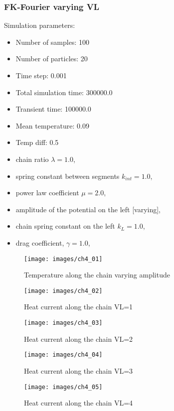 \subsubsection{FK-Fourier varying VL}
Simulation parameters:
\begin{itemize}
	\item Number of samples: 100
	\item Number of particles: 20
	\item Time step: 0.001
	\item Total simulation time: 300000.0
	\item Transient time: 100000.0
	\item Mean temperature: 0.09
	\item Temp diff: 0.5
	\item chain ratio $ \lambda=1.0 $,
	\item spring constant between segments $ k_{int} = 1.0 $,
	\item power law coefficient $ \mu=2.0 $,
	\item amplitude of the potential on the left [varying],
	\item chain spring constant on the left $ k_{L}=1.0 $,
	\item drag coefficient, $ \gamma=1.0 $,
\end{itemize}

\begin{figure}[H]
	\centering
	\texttt{[image: images/ch4\_01]}
	\caption{Temperature along the chain varying amplitude}
	\label{fig:ch4_01}
\end{figure}

\begin{figure}[H]
	\centering
	\texttt{[image: images/ch4\_02]}
	\caption{Heat current along the chain VL=1}
	\label{fig:ch4_02}
\end{figure}


\begin{figure}[H]
	\centering
	\texttt{[image: images/ch4\_03]}
	\caption{Heat current along the chain VL=2}
	\label{fig:ch4_03}
\end{figure}

\begin{figure}[H]
	\centering
	\texttt{[image: images/ch4\_04]}
	\caption{Heat current along the chain VL=3}
	\label{fig:ch4_04}
\end{figure}

\begin{figure}[H]
	\centering
	\texttt{[image: images/ch4\_05]}
	\caption{Heat current along the chain VL=4}
	\label{fig:ch4_05}
\end{figure}

